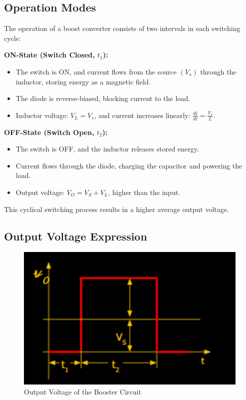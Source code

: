\documentclass[12pt]{article}
\begin{document}
\subsection*{Operation Modes}
The operation of a boost converter consists of two intervals in each switching cycle:
\begin{description}
    \item \textbf{ON-State (Switch Closed, $t_1$):}
          \begin{itemize}
              \item The switch is ON, and current flows from the source $(V_s)$ through the inductor, storing energy as a magnetic field.
              \item The diode is reverse-biased, blocking current to the load.
              \item Inductor voltage: \( V_L = V_s \), and current increases linearly: \( \frac{di}{dt} = \frac{V_s}{L} \).
          \end{itemize}
    \item \textbf{OFF-State (Switch Open, $t_2$):}
          \begin{itemize}
              \item The switch is OFF, and the inductor releases stored energy.
              \item Current flows through the diode, charging the capacitor and powering the load.
              \item Output voltage: \( V_O = V_S + V_L \), higher than the input.
          \end{itemize}
\end{description}
This cyclical switching process results in a higher average output voltage.

\subsection*{Output Voltage Expression}
\begin{figure}[H]
    \centering
    \includegraphics[width=.5\textwidth]{ch1.png}
    \caption{Output Voltage of the Booster Circuit}
\end{figure}
\end{document}
